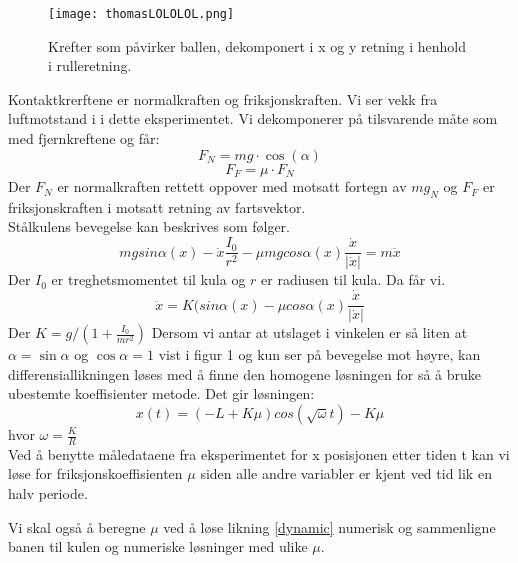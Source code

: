 \documentclass[5p,sort&compress]{elsarticle}
\begin{document}
\begin{figure}[tbp] 
\centering
\texttt{[image: thomasLOLOLOL.png]}

\caption{Krefter som påvirker ballen, dekomponert i x og y retning i henhold i rulleretning.}
\label{fig:pendel} %
\end{figure}

Kontaktkrerftene er normalkraften og friksjonskraften. Vi ser vekk fra luftmotstand i i dette eksperimentet. Vi dekomponerer på tilsvarende måte som med fjernkreftene og får:
\begin{equation}
F_{N} = mg\cdot\cos(\alpha)
\end{equation}
\begin{equation}
F_{F} = \mu\cdot F_{N}
\end{equation}
Der $F_{N}$ er normalkraften rettett oppover med motsatt fortegn av $mg_{N}$ og $F_{F}$ er friksjonskraften i motsatt retning av fartsvektor.
\\
Stålkulens bevegelse kan beskrives som følger.
\begin{equation}
    mgsin\alpha (x) - \ddot{x}\frac{I_{0}}{r^2} - \mu mgcos\alpha (x) \frac{\dot{x}}{|\dot{x}|} = m\ddot{x}
    \label{dynamic}
\end{equation}
Der $I_{0}$ er treghetsmomentet til kula og $r$ er radiusen til kula.
Da får vi.
\begin{equation}
    \ddot{x} = K(sin\alpha (x) - \mu cos\alpha (x) \frac{\dot{x}}{|\dot{x}|}
    \label{diffing}
\end{equation}
Der $K = g/(1+\frac{I_{0}}{mr^2})$
Dersom vi antar at utslaget i vinkelen er så liten at $ \alpha = \sin\alpha $ og $\cos\alpha = 1$  vist i figur 1 og kun ser på bevegelse mot høyre, kan differensiallikningen løses med å finne den homogene løsningen for så å bruke ubestemte koeffisienter metode. Det gir løsningen:
\begin{equation}
x(t) = (-L + K\mu)cos(\sqrt{\omega}t)-K\mu
\end{equation}
hvor $\omega=\frac{K}{R}$\\
Ved å benytte måledataene fra eksperimentet for x posisjonen etter tiden t kan vi løse for friksjonskoeffisienten $\mu$ siden alle andre variabler er kjent ved tid lik en halv periode.

Vi skal også å beregne $\mu$ ved å løse likning \eqref{dynamic} numerisk og sammenligne banen til kulen og numeriske løsninger med ulike $\mu$. 
\end{document}
